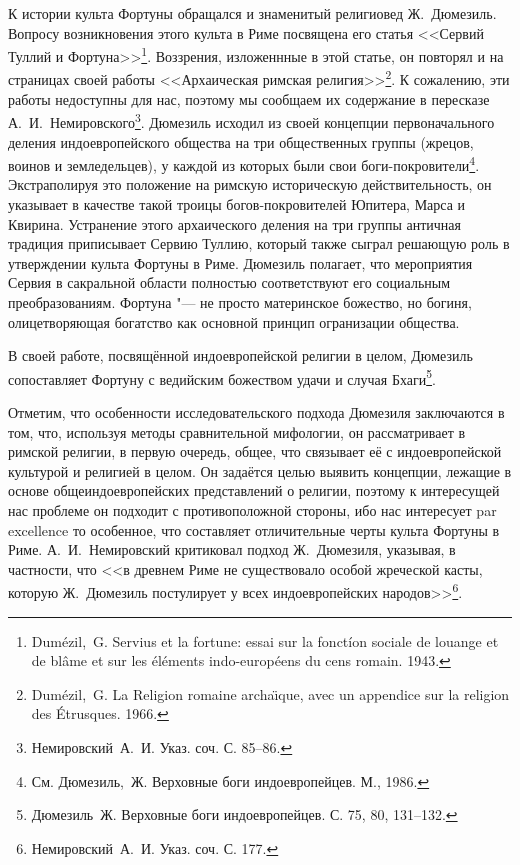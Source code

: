 

К истории культа Фортуны обращался и знаменитый религиовед Ж.~Дюмезиль\label{DumezilFort}. Вопросу возникновения этого культа в Риме посвящена его статья <<Сервий Туллий и Фортуна>>\footnote{Dum\'{e}zil,~G. Servius et la fortune: essai sur la fonctíon sociale de louange et de bl\^{a}me et sur les \'{e}l\'{e}ments indo-europ\'{e}ens du cens romain. 1943.}. Воззрения, изложеннные в этой статье, он повторял и на страницах своей работы <<Архаическая римская религия>>\footnote{Dum\'{e}zil,~G. La Religion romaine archa\"\i{}que, avec un appendice sur la religion des \'{E}trusques. 1966.}. К сожалению, эти работы недоступны для нас, поэтому мы сообщаем их содержание в пересказе А.~И.~Немировского\footnote{Немировский~А.~И. Указ. соч. С. 85--86.}. Дюмезиль исходил из своей концепции первоначального деления индоевропейского общества на три общественных группы (жрецов, воинов и земледельцев), у каждой из которых были свои боги-покровители\footnote{См. Дюмезиль,~Ж. Верховные боги индоевропейцев. М., 1986.}. Экстраполируя это положение на римскую историческую действительность, он указывает в качестве такой троицы богов-покровителей Юпитера, Марса и Квирина. Устранение этого архаического деления на три группы античная традиция приписывает Сервию Туллию, который также сыграл решающую роль в утверждении культа Фортуны в Риме. Дюмезиль полагает, что мероприятия Сервия в сакральной области полностью соответствуют его социальным преобразованиям. Фортуна "--- не просто материнское божество, но богиня, олицетворяющая богатство как основной принцип огранизации общества.

В своей работе, посвящённой индоевропейской религии в целом, Дюмезиль сопоставляет Фортуну с ведийским божеством удачи и случая Бхаги\footnote{Дюмезиль~Ж. Верховные боги индоевропейцев. С. 75, 80, 131--132.}. 

Отметим, что особенности исследовательского подхода Дюмезиля заключаются в том, что, используя методы сравнительной мифологии, он рассматривает в римской религии, в первую очередь, общее, что связывает её с индоевропейской культурой и религией в целом. Он задаётся целью выявить концепции, лежащие в основе общеиндоевропейских представлений о религии, поэтому к интересущей нас проблеме он подходит с противоположной стороны, ибо нас интересует par excellence то особенное, что составляет отличительные черты культа Фортуны в Риме. А.~И.~Немировский критиковал подход Ж.~Дюмезиля, указывая, в частности, что <<в древнем Риме не существовало особой жреческой касты, которую Ж.~Дюмезиль постулирует у всех индоевропейских народов>>\footnote{Немировский~А.~И. Указ. соч. С. 177.}.


